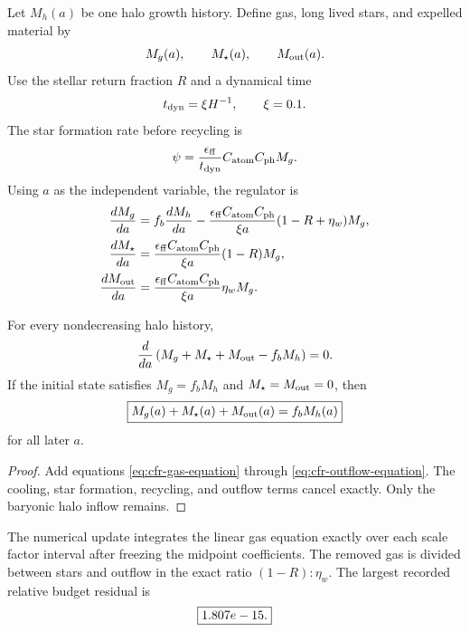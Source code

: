 Let $M_h(a)$ be one halo growth history.  Define gas, long lived stars, and expelled material by
\begin{equation}
M_g(a),\qquad M_\star(a),\qquad M_{\rm out}(a).
\end{equation}
Use the stellar return fraction $R$ and a dynamical time
\begin{equation}
t_{\rm dyn}=\xi H^{-1},
\qquad
\xi=0.1.
\label{eq:cfr-dynamical-time}
\end{equation}
The star formation rate before recycling is
\begin{equation}
\psi
=
\frac{\epsilon_{\rm ff}}{t_{\rm dyn}}
C_{\rm atom}C_{\rm ph}M_g.
\label{eq:cfr-star-formation-rate}
\end{equation}
Using $a$ as the independent variable, the regulator is
\begin{align}
\frac{dM_g}{da}
&=
f_b\frac{dM_h}{da}
-
\frac{\epsilon_{\rm ff}C_{\rm atom}C_{\rm ph}}{\xi a}
(1-R+\eta_w)M_g,
\label{eq:cfr-gas-equation}
\\
\frac{dM_\star}{da}
&=
\frac{\epsilon_{\rm ff}C_{\rm atom}C_{\rm ph}}{\xi a}
(1-R)M_g,
\label{eq:cfr-star-equation}
\\
\frac{dM_{\rm out}}{da}
&=
\frac{\epsilon_{\rm ff}C_{\rm atom}C_{\rm ph}}{\xi a}
\eta_wM_g.
\label{eq:cfr-outflow-equation}
\end{align}

\begin{theorem}
For every nondecreasing halo history,
\begin{equation}
\frac{d}{da}
\left(
M_g+M_\star+M_{\rm out}-f_bM_h
\right)
=0.
\label{eq:cfr-budget-derivative}
\end{equation}
If the initial state satisfies $M_g=f_bM_h$ and $M_\star=M_{\rm out}=0$, then
\begin{equation}
\boxed{
M_g(a)+M_\star(a)+M_{\rm out}(a)=f_bM_h(a)
}
\label{eq:cfr-exact-budget}
\end{equation}
for all later $a$.
\end{theorem}

\begin{proof}
Add equations \eqref{eq:cfr-gas-equation} through \eqref{eq:cfr-outflow-equation}.  The cooling, star formation, recycling, and outflow terms cancel exactly.  Only the baryonic halo inflow remains.
\end{proof}

The numerical update integrates the linear gas equation exactly over each scale factor interval after freezing the midpoint coefficients.  The removed gas is divided between stars and outflow in the exact ratio $(1-R):\eta_w$.  The largest recorded relative budget residual is
\begin{equation}
\boxed{1.807e-15.}
\label{eq:cfr-budget-residual}
\end{equation}

